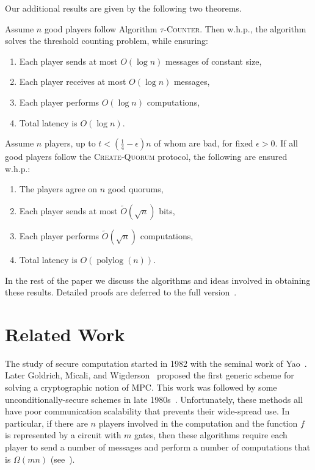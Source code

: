 \documentclass[10pt]{llncs}
\newcommand{\whp}{w.h.p.\xspace}
\DeclareMathOperator{\polylog}{polylog}
\newcommand{\tc}{\textsc{$\tau$-Counter}\xspace}
\newcommand{\cq}{\textsc{Create-Quorum}\xspace}
\begin{document}
\noindent
Our additional results are given by the following two theorems.

\begin{theorem}
Assume $n$ good players follow Algorithm \tc.   Then \whp, 
the algorithm solves the threshold counting problem, while ensuring:
\begin{enumerate}
\item Each player sends at most $O(\log{n})$ messages of constant size,
\item Each player receives at most  $O(\log{n})$ messages,
\item Each player performs $O(\log{n})$ computations,
\item Total latency is $O(\log{n})$.
\end{enumerate}
\label{theo:2}
\end{theorem}


\begin{theorem}
Assume $n$ players, up to $t<(\frac14-\epsilon)n$ of whom are 
bad, for fixed $\epsilon>0$.  If all good players follow the \cq protocol, the following are ensured \whp:
\begin{enumerate}
\item The players agree on $n$ good quorums,
\item Each player sends at most $\tilde{O}(\sqrt n)$ bits,
\item Each player performs $\tilde{O}(\sqrt n)$ computations,
\item Total latency is $O(\polylog(n))$.
\end{enumerate}
\label{thm:quorum-formation}
\end{theorem}

In the rest of the paper we discuss the algorithms and ideas involved in 
obtaining these results. Detailed proofs are deferred to the full 
version~\cite{dkms2013}.


\section{Related Work}

The study of secure computation started in 1982 with the seminal work
of Yao~\cite{yao1982protocols}. Later Goldrich, Micali, and
Wigderson~\cite{goldreich1987play} proposed the first generic scheme
for solving a cryptographic notion of MPC. This work was followed by
some unconditionally-secure schemes in late 1980s~\cite{benor_goldwasser_wigderson:completeness,chaum_crepeau_damgard:multiparty,rabin1989verifiable,benor_canetti_goldreich:asynchronous,hirt2001robustness,hirt2005upper,ZH06}. 
Unfortunately, these methods all have poor communication scalability that prevents their 
wide-spread use. In particular, if there are $n$ players
involved in the computation and the function $f$ is represented by a
circuit with $m$ gates, then these algorithms require each player to
send a number of messages and perform a number of computations that is
$\Omega(mn)$ (see~\cite{frikken2010secure,goldreich1998secure,du2001secure}).
\end{document}
